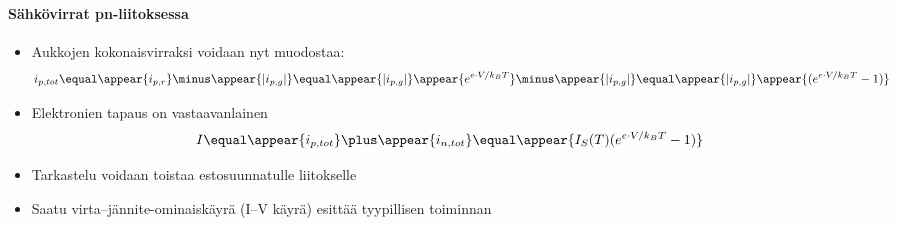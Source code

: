 %
%
%


\begin{frame}
\frametitle{\texorpdfstring{\culine[\sectiontitleulinecolor]{\sectiontitle}}{\sectiontitle} }
\framesubtitle{Sähkövirrat pn-liitoksessa}
\appear{}
\begin{itemize}
	\item Aukkojen kokonaisvirraksi voidaan nyt muodostaa:
\[
i_{p, t o t}   \equal \appear{i_{p, r}}  \minus \appear{| i_{p, g} | }  \equal  \appear{| i_{p, g} | }\appear{e^{e \cdot V / k_{B} T}}  \minus \appear{ | i_{p, g} |}  \equal  \appear{| i_{p, g} | }\appear{(e^{e \cdot V / k_{B} T}-1)}
\]
	\item Elektronien tapaus on vastaavanlainen
\[
 I  \equal \appear{i_{p, t o t}}  \plus \appear{i_{n, t o t}} \equal \appear{I_{S}(T) ( e^{e \cdot V / k_{B} T}-1 )}
 \]

\item Tarkastelu voidaan toistaa estosuunnatulle liitokselle

\item Saatu virta–jännite-ominaiskäyrä (I–V käyrä) esittää tyypillisen  toiminnan%
\end{itemize}

\endofslide 
\end{frame}

